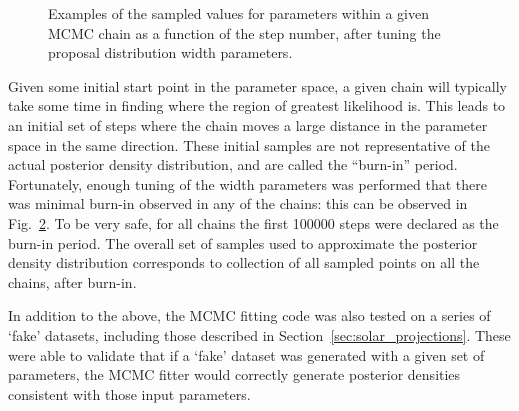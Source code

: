 \begin{figure}
\begin{subfigure}{0.98\textwidth}
        \caption{\tonetwo{}}
        \label{fig:theta_12_vs_step}
    \end{subfigure}
    \caption[Examples of the sampled values for parameters within a given MCMC chain as a function of the step number]
    {Examples of the sampled values for parameters within a given MCMC chain as a function of the step number, after tuning the proposal distribution width parameters.}
    \label{fig:params_vs_step_plots}
\end{figure}

Given some initial start point in the parameter space, a given chain will typically take some time in finding where the region of greatest likelihood is. This leads to an initial set of steps where the chain moves a large distance in the parameter space in the same direction. 
These initial samples are not representative of the actual posterior density distribution, and are called the ``burn-in'' period. Fortunately, enough tuning of the width parameters was performed that there was minimal burn-in observed in any of the chains: this can be observed in Fig.~\ref{fig:params_vs_step_plots}. 
To be very safe, for all chains the first \num{100000} steps were declared as the burn-in period. The overall set of samples used to approximate the posterior density distribution corresponds to collection of all sampled points on all the chains, after burn-in.

In addition to the above, the MCMC fitting code was also tested on a series of `fake' datasets, including those described in Section~\ref{sec:solar_projections}. These were able to validate that if a `fake' dataset was generated with a given set of parameters, the MCMC fitter would correctly generate posterior densities consistent with those input parameters.


